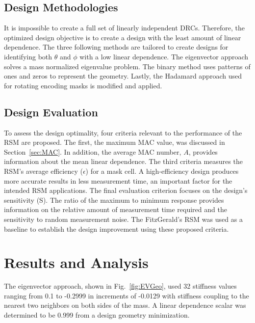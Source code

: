 \documentclass[twocolumn,10pt,final]{asme2ej}
\begin{document}
\vspace{-0.2 cm}
\subsection{Design Methodologies} \label{design-methods}
It is impossible to create a full set of linearly independent DRCs.  
Therefore, the optimized design objective is to create a design with the least amount of linear dependence.  
The three following methods are tailored to create designs for identifying both $\theta$ and $\phi$ with a low linear dependence.  
The eigenvector approach solves a mass normalized eigenvalue problem.  
The binary method uses patterns of ones and zeros to represent the geometry.
Lastly, the Hadamard approach used for rotating encoding masks is modified and applied.

\vspace{-0.2 cm}
\subsection{Design Evaluation}
\label{sec:Eval}
To assess the design optimality, four criteria relevant to the performance of the RSM are proposed.  The first, the maximum MAC value, was discussed in Section~\ref{sec:MAC}.  
In addition, the average MAC number, $A$, provides information about the mean linear dependence.  
The third criteria measures the RSM's average efficiency ($\epsilon$) for a mask cell. 
A high-efficiency design produces more accurate results in less measurement time, an important factor for the intended RSM applications.  
The final evaluation criterion focuses on the design's sensitivity (S).  
The ratio of the maximum to minimum response provides information on the relative amount of measurement time required and the  sensitivity to random measurement noise.
The FitzGerald's RSM was used as a baseline to establish the design improvement using these proposed criteria.  

\vspace{-0.3 cm}
\section{Results and Analysis}
The eigenvector approach, shown in Fig.~\ref{fig:EVGeo}, used 32 stiffness values ranging from 0.1 to -0.2999 in increments of -0.0129 with stiffness coupling to the nearest two neighbors on both sides of the mass.
A linear dependence scalar was determined to be 0.999 from a design geometry minimization.
\end{document}
